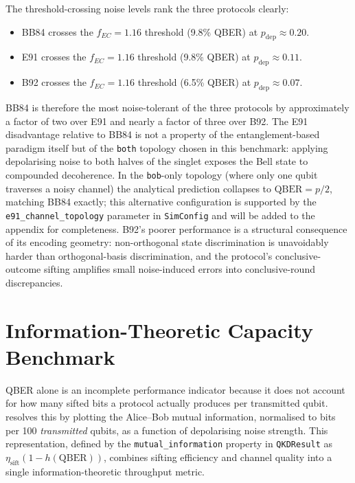 \documentclass[10pt, a4paper]{report}
\begin{document}
The threshold-crossing noise levels rank the three protocols clearly:
%
\begin{itemize}
    \item BB84 crosses the $f_{EC}\!=\!1.16$ threshold (9.8\% QBER) at $p_{\mathrm{dep}}\!\approx\!0.20$.
    \item E91 crosses the $f_{EC}\!=\!1.16$ threshold (9.8\% QBER) at $p_{\mathrm{dep}}\!\approx\!0.11$.
    \item B92 crosses the $f_{EC}\!=\!1.16$ threshold (6.5\% QBER) at $p_{\mathrm{dep}}\!\approx\!0.07$.
\end{itemize}
%
BB84 is therefore the most noise-tolerant of the three protocols by approximately a factor of two over E91 and nearly a factor of three over B92. The E91 disadvantage relative to BB84 is not a property of the entanglement-based paradigm itself but of the \texttt{both} topology chosen in this benchmark: applying depolarising noise to both halves of the singlet exposes the Bell state to compounded decoherence. In the \texttt{bob}-only topology (where only one qubit traverses a noisy channel) the analytical prediction collapses to $\text{QBER}=p/2$, matching BB84 exactly; this alternative configuration is supported by the \texttt{e91\_channel\_topology} parameter in \texttt{SimConfig} and will be added to the appendix for completeness. B92's poorer performance is a structural consequence of its encoding geometry: non-orthogonal state discrimination is unavoidably harder than orthogonal-basis discrimination, and the protocol's conclusive-outcome sifting amplifies small noise-induced errors into conclusive-round discrepancies.

\section{Information-Theoretic Capacity Benchmark}
\label{sec:results-mutual-info}

QBER alone is an incomplete performance indicator because it does not account for how many sifted bits a protocol actually produces per transmitted qubit.  resolves this by plotting the Alice--Bob mutual information, normalised to bits per 100 \emph{transmitted} qubits, as a function of depolarising noise strength. This representation, defined by the \texttt{mutual\_information} property in \texttt{QKDResult} as $\eta_{\mathrm{sift}}(1 - h(\text{QBER}))$, combines sifting efficiency and channel quality into a single information-theoretic throughput metric.
\end{document}
